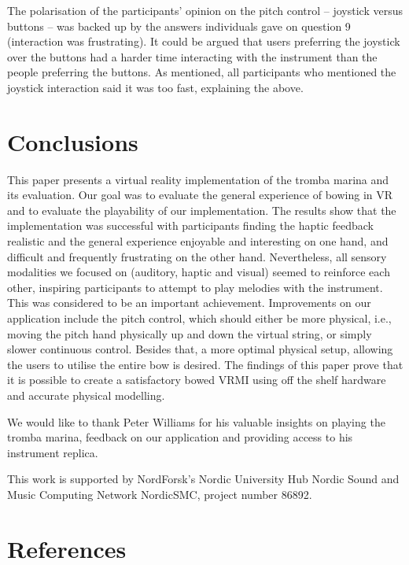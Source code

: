 \documentclass[dvipsnames, pdftex]{article}
\begin{document}
The polarisation of the participants' opinion on the pitch control -- joystick versus buttons -- was backed up by the answers individuals gave on question 9 (interaction was frustrating). It could be argued that users preferring the joystick over the buttons had a harder time interacting with the instrument than the people preferring the buttons. As mentioned, all participants who mentioned the joystick interaction said it was too fast, explaining the above.

\section{Conclusions} \label{sec:conclusion}
This paper presents a virtual reality implementation of the tromba marina and its evaluation. Our goal was to evaluate the general experience of bowing in VR and to evaluate the playability of our implementation. The results show that the implementation was successful with participants finding the haptic feedback realistic and the general experience enjoyable and interesting on one hand, and difficult and frequently frustrating on the other hand. Nevertheless, all sensory modalities we focused on (auditory, haptic and visual) seemed to reinforce each other, inspiring participants to attempt to play melodies with the instrument. This was considered to be an important achievement.
Improvements on our application include the pitch control, which  should either be more physical, i.e., moving the pitch hand physically up and down the virtual string, or simply slower continuous control. Besides that, a more optimal physical setup, allowing the users to utilise the entire bow is desired.
The findings of this paper prove that it is possible to create a satisfactory bowed VRMI using off the shelf hardware and accurate physical modelling. 

\begin{acknowledgments}
We would like to thank Peter Williams for his valuable insights on playing the tromba marina, feedback on our application and providing access to his instrument replica. 

This work is supported by NordForsk's Nordic
University Hub Nordic Sound and Music Computing Network
NordicSMC, project number 86892.
\end{acknowledgments} 

\section{References}
{
\small

}
\end{document}
